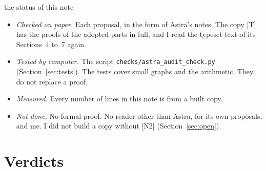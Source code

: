 \documentclass[11pt]{article}
\begin{document}
\begin{notation}{the status of this note}
\begin{itemize}[leftmargin=1.2em]
\item \emph{Checked on paper.} Each proposal, in the form of Astra's notes. The copy [T] has the
proofs of the adopted parts in full, and I read the typeset text of its Sections~4 to~7 again.
\item \emph{Tested by computer.} The script \texttt{checks/astra\_audit\_check.py}
(Section~\ref{sec:tests}). The tests cover small graphs and the arithmetic. They do not replace
a proof.
\item \emph{Measured.} Every number of lines in this note is from a built copy.
\item \emph{Not done.} No formal proof. No reader other than Astra, for its own proposals, and
me. I did not build a copy without [N2] (Section~\ref{sec:open}).
\end{itemize}
\end{notation}

\contentsblock

\section{Verdicts}\label{sec:verdicts}
\end{document}
